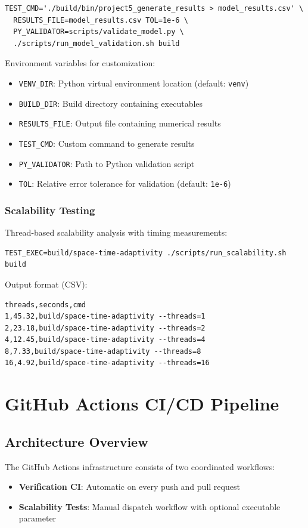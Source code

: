 \documentclass[11pt,a4paper]{article}
\begin{document}
\begin{lstlisting}
TEST_CMD='./build/bin/project5_generate_results > model_results.csv' \
  RESULTS_FILE=model_results.csv TOL=1e-6 \
  PY_VALIDATOR=scripts/validate_model.py \
  ./scripts/run_model_validation.sh build
\end{lstlisting}

Environment variables for customization:
\begin{itemize}
    \item \texttt{VENV\_DIR}: Python virtual environment location (default: \texttt{venv})
    \item \texttt{BUILD\_DIR}: Build directory containing executables
    \item \texttt{RESULTS\_FILE}: Output file containing numerical results
    \item \texttt{TEST\_CMD}: Custom command to generate results
    \item \texttt{PY\_VALIDATOR}: Path to Python validation script
    \item \texttt{TOL}: Relative error tolerance for validation (default: \texttt{1e-6})
\end{itemize}

\subsubsection{Scalability Testing}
Thread-based scalability analysis with timing measurements:

\begin{lstlisting}
TEST_EXEC=build/space-time-adaptivity ./scripts/run_scalability.sh build
\end{lstlisting}

Output format (CSV):
\begin{lstlisting}
threads,seconds,cmd
1,45.32,build/space-time-adaptivity --threads=1
2,23.18,build/space-time-adaptivity --threads=2
4,12.45,build/space-time-adaptivity --threads=4
8,7.33,build/space-time-adaptivity --threads=8
16,4.92,build/space-time-adaptivity --threads=16
\end{lstlisting}

\newpage

\section{GitHub Actions CI/CD Pipeline}

\subsection{Architecture Overview}
The GitHub Actions infrastructure consists of two coordinated workflows:
\begin{itemize}
    \item \textbf{Verification CI}: Automatic on every push and pull request
    \item \textbf{Scalability Tests}: Manual dispatch workflow with optional executable parameter
\end{itemize}
\end{document}
